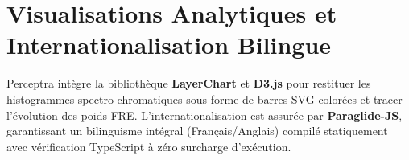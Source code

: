 \section{Visualisations Analytiques et Internationalisation Bilingue}

Perceptra intègre la bibliothèque \textbf{LayerChart} et \textbf{D3.js} pour restituer les histogrammes spectro-chromatiques sous forme de barres SVG colorées et tracer l'évolution des poids FRE. L'internationalisation est assurée par \textbf{Paraglide-JS}, garantissant un bilinguisme intégral (Français/Anglais) compilé statiquement avec vérification TypeScript à zéro surcharge d'exécution.
